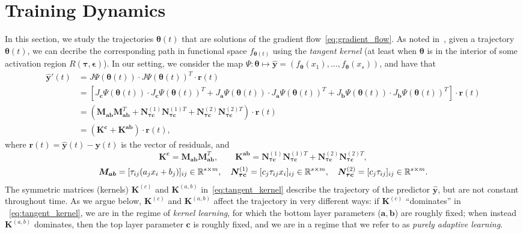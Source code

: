 \section{Training Dynamics}

In this section, we study the trajectories $\bm \theta(t)$ that are solutions of the gradient flow~\eqref{eq:gradient_flow}. As noted in~\cite{NTKJacot}, given a trajectory $\bm \theta(t)$, we can decribe the corresponding path in functional space $f_{\bm \theta(t)}$ using the \emph{tangent kernel} (at least when $\bm \theta$ is in the interior of some activation region $R(\bm \tau,\bm \epsilon)$). In our setting, we consider the map $\Psi: \bm \theta \mapsto {\bm {\hat y}} = (f_{\bm \theta}(x_1),\ldots,f_{\bm \theta}(x_s))$, and have that
\begin{equation}\label{eq:tangent_kernel}
\begin{aligned}
    {\bm {\hat y}}'(t) &= J \Psi(\bm \theta(t)) \cdot J \Psi(\bm \theta(t))^T \cdot \bm r(t)\\
    &= [J_{\bm c} \Psi(\bm \theta(t)) \cdot J_{\bm c} \Psi(\bm \theta(t))^T + J_{\bm a} \Psi(\bm \theta(t)) \cdot J_{\bm a} \Psi(\bm \theta(t))^T + J_{\bm b} \Psi(\bm \theta(t)) \cdot J_{\bm b} \Psi(\bm \theta(t))^T] \cdot \bm r(t)\\
    &= (\bm M_{\bm a\bm b} \bm M_{\bm a\bm b}^T + \bm N^{(1)}_{\bm \tau \bm c} {\bm N_{\bm \tau \bm c}^{(1)T}} + \bm N^{(2)}_{\bm \tau \bm c} {\bm N_{\bm \tau \bm c}^{(2)T}}) \cdot \bm r(t)\\
    & = (\bm K^{\bm c} + \bm K^{\bm a\bm b}) \cdot \bm r(t),
\end{aligned}
\end{equation}
where $\bm r(t) = \bm{\hat y}(t) - \bm y(t)$ is the vector of residuals, and
\begin{equation}
    \bm K^{\bm c}= \bm M_{\bm a\bm b} \bm M_{\bm a\bm b}^T, \qquad
    \bm K^{\bm a \bm b} = \bm N^{(1)}_{\bm \tau \bm c} {\bm N_{\bm \tau \bm c}^{(1)T}} + \bm N^{(2)}_{\bm \tau \bm c} {\bm N_{\bm \tau \bm c}^{(2)T}},
\end{equation}
\begin{equation}
    \bm M_{\bm a\bm b} = [\tau_{ij}(a_j x_i + b_j)]_{ij} \in \mathbb{R}^{s \times m}, \quad \bm N_{\bm \tau \bm c}^{(1)}= [c_j \tau_{ij} x_i]_{ij} \in \mathbb{R}^{s \times m},
    \quad \bm N_{\bm \tau \bm c}^{(2)} = [c_j \tau_{ij}]_{ij} \in \mathbb{R}^{s \times m}.
\end{equation}
The symmetric matrices (kernels) $\bm K^{(c)}$ and $\bm K^{(a,b)}$ in~\eqref{eq:tangent_kernel} describe the trajectory of the predictor $\bm {\hat y}$, but are not constant throughout time. As we argue below, $\bm K^{(c)}$ and $\bm K^{(a,b)}$ affect the trajectory in very different ways: if $\bm K^{(c)}$ ``dominates'' in ~\eqref{eq:tangent_kernel}, we are in the regime of \emph{kernel learning}, for which the bottom layer parameters ($\bm a, \bm b$) are roughly fixed; when instead $\bm K^{(a, b)}$ dominates, then the top layer parameter $\bm c$ is roughly fixed, and we are in a regime that we refer to as \emph{purely adaptive learning}.
